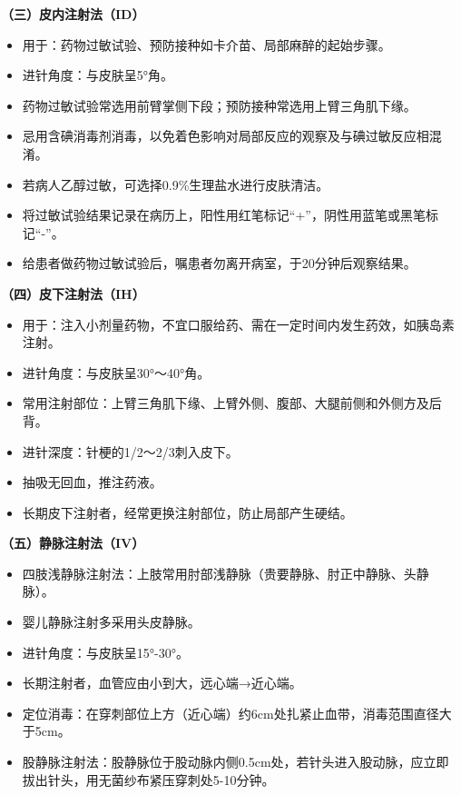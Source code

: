 \documentclass[11pt, a4paper]{ctexart}
\begin{document}
\textbf{（三）皮内注射法（ID）}
\begin{itemize}
    \item 用于：药物过敏试验、预防接种如卡介苗、局部麻醉的起始步骤。
    \item 进针角度：与皮肤呈5°角。
    \item 药物过敏试验常选用前臂掌侧下段；预防接种常选用上臂三角肌下缘。
    \item 忌用含碘消毒剂消毒，以免着色影响对局部反应的观察及与碘过敏反应相混淆。
    \item 若病人乙醇过敏，可选择0.9\%生理盐水进行皮肤清洁。
    \item 将过敏试验结果记录在病历上，阳性用红笔标记“+”，阴性用蓝笔或黑笔标记“-”。
    \item 给患者做药物过敏试验后，嘱患者勿离开病室，于20分钟后观察结果。
\end{itemize}

\textbf{（四）皮下注射法（IH）}
\begin{itemize}
    \item 用于：注入小剂量药物，不宜口服给药、需在一定时间内发生药效，如胰岛素注射。
    \item 进针角度：与皮肤呈30°～40°角。
    \item 常用注射部位：上臂三角肌下缘、上臂外侧、腹部、大腿前侧和外侧方及后背。
    \item 进针深度：针梗的1/2～2/3刺入皮下。
    \item 抽吸无回血，推注药液。
    \item 长期皮下注射者，经常更换注射部位，防止局部产生硬结。
\end{itemize}

\textbf{（五）静脉注射法（IV）}
\begin{itemize}
    \item 四肢浅静脉注射法：上肢常用肘部浅静脉（贵要静脉、肘正中静脉、头静脉）。
    \item 婴儿静脉注射多采用头皮静脉。
    \item 进针角度：与皮肤呈15°-30°。
    \item 长期注射者，血管应由小到大，远心端→近心端。
    \item 定位消毒：在穿刺部位上方（近心端）约6cm处扎紧止血带，消毒范围直径大于5cm。
    \item 股静脉注射法：股静脉位于股动脉内侧0.5cm处，若针头进入股动脉，应立即拔出针头，用无菌纱布紧压穿刺处5-10分钟。
\end{itemize}
\end{document}
